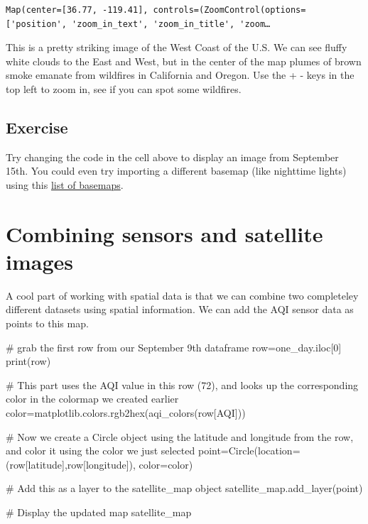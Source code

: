 \documentclass[
  letterpaper,
  DIV=11,
  numbers=noendperiod]{scrreprt}
\newenvironment{Shaded}{\begin{snugshade}}{\end{snugshade}}
\newcommand{\BuiltInTok}[1]{\textcolor[rgb]{0.00,0.23,0.31}{#1}}
\newcommand{\CommentTok}[1]{\textcolor[rgb]{0.37,0.37,0.37}{#1}}
\newcommand{\DecValTok}[1]{\textcolor[rgb]{0.68,0.00,0.00}{#1}}
\newcommand{\NormalTok}[1]{\textcolor[rgb]{0.00,0.23,0.31}{#1}}
\newcommand{\OperatorTok}[1]{\textcolor[rgb]{0.37,0.37,0.37}{#1}}
\newcommand{\StringTok}[1]{\textcolor[rgb]{0.13,0.47,0.30}{#1}}
\begin{document}
\begin{verbatim}
Map(center=[36.77, -119.41], controls=(ZoomControl(options=['position', 'zoom_in_text', 'zoom_in_title', 'zoom…
\end{verbatim}

This is a pretty striking image of the West Coast of the U.S. We can see
fluffy white clouds to the East and West, but in the center of the map
plumes of brown smoke emanate from wildfires in California and Oregon.
Use the + - keys in the top left to zoom in, see if you can spot some
wildfires.

\hypertarget{exercise-8}{%
\subsection{Exercise}\label{exercise-8}}

Try changing the code in the cell above to display an image from
September 15th. You could even try importing a different basemap (like
nighttime lights) using this
\href{https://ipyleaflet.readthedocs.io/en/latest/map_and_basemaps/basemaps.html}{list
of basemaps}.

\hypertarget{combining-sensors-and-satellite-images}{%
\section{Combining sensors and satellite
images}\label{combining-sensors-and-satellite-images}}

A cool part of working with spatial data is that we can combine two
completeley different datasets using spatial information. We can add the
AQI sensor data as points to this map.

\begin{Shaded}
\begin{Highlighting}[]
\CommentTok{\# grab the first row from our September 9th dataframe}
\NormalTok{row}\OperatorTok{=}\NormalTok{one\_day.iloc[}\DecValTok{0}\NormalTok{]}
\BuiltInTok{print}\NormalTok{(row)}

\CommentTok{\# This part uses the AQI value in this row (72), and looks up the corresponding color in the colormap we created earlier }
\NormalTok{color}\OperatorTok{=}\NormalTok{matplotlib.colors.rgb2hex(aqi\_colors(row[}\StringTok{\textquotesingle{}AQI\textquotesingle{}}\NormalTok{]))}

\CommentTok{\# Now we create a Circle object using the latitude and longitude from the row, and color it using the color we just selected}
\NormalTok{point}\OperatorTok{=}\NormalTok{Circle(location}\OperatorTok{=}\NormalTok{(row[}\StringTok{\textquotesingle{}latitude\textquotesingle{}}\NormalTok{],row[}\StringTok{\textquotesingle{}longitude\textquotesingle{}}\NormalTok{]), color}\OperatorTok{=}\NormalTok{color)}

\CommentTok{\# Add this as a layer to the satellite\_map object}
\NormalTok{satellite\_map.add\_layer(point)}

\CommentTok{\# Display the updated map}
\NormalTok{satellite\_map}
\end{Highlighting}
\end{Shaded}
\end{document}
